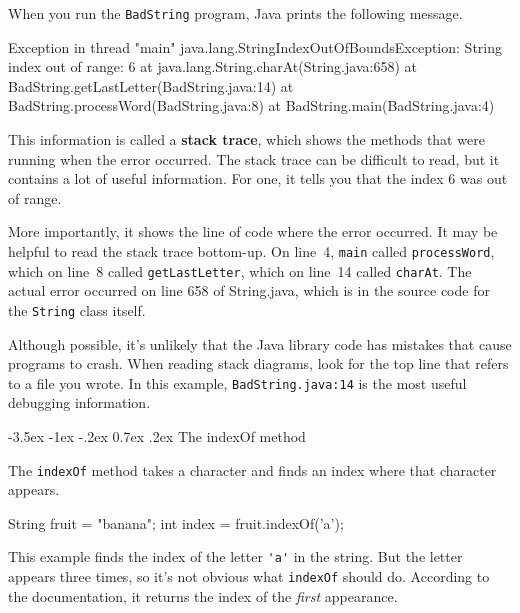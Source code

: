 \documentclass[12pt]{book}
\makeatletter
\theoremstyle{exercise}
\newcommand{\java}[1]{\verb"#1"}
\renewcommand{\section}{\@startsection{section}{1}{\z@}%
    {-3.5ex \@plus -1ex \@minus -.2ex}%
    {0.7ex \@plus.2ex}%
    {\normalfont\Large\bfseries}}
\newcommand{\java}[1]{\lstinline{#1}} %
\makeatother
\begin{document}
When you run the \java{BadString} program, Java prints the following message.

\begin{small}
\begin{stdout}
Exception in thread "main" java.lang.StringIndexOutOfBoundsException:
String index out of range: 6
    at java.lang.String.charAt(String.java:658)
    at BadString.getLastLetter(BadString.java:14)
    at BadString.processWord(BadString.java:8)
    at BadString.main(BadString.java:4)
\end{stdout}
\end{small}



This information is called a {\bf stack trace}, which shows the methods that were running when the error occurred.
The stack trace can be difficult to read, but it contains a lot of useful information.
For one, it tells you that the index 6 was out of range.

More importantly, it shows the line of code where the error occurred.
It may be helpful to read the stack trace bottom-up.
On line~4, \java{main} called \java{processWord}, which on line~8 called \java{getLastLetter}, which on line~14 called \java{charAt}.
The actual error occurred on line 658 of String.java, which is in the source code for the \java{String} class itself.

Although possible, it's unlikely that the Java library code has mistakes that cause programs to crash.
When reading stack diagrams, look for the top line that refers to a file you wrote.
In this example, \java{BadString.java:14} is the most useful debugging information.


\section{The indexOf method}

The \java{indexOf} method takes a character and finds an index where that character appears.

\begin{code}
    String fruit = "banana";
    int index = fruit.indexOf('a');
\end{code}

This example finds the index of the letter \java{'a'} in the string.
But the letter appears three times, so it's not obvious what \java{indexOf} should do.
According to the documentation, it returns the index of the {\em first} appearance.
\end{document}
